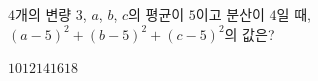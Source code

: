 $4$개의 변량 $3$, $a$, $b$, $c$의 평균이 $5$이고 분산이 $4$일 때, $(a-5)^2+(b-5)^2+(c-5)^2$의 값은?
\begin{choices32}{$10$}{$12$}{$14$}{$16$}{$18$}\end{choices32}
